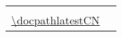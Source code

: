 
\begin{tiplisting}
    \vspace{-3.7em}
    \begin{longtable}[l]{ m{13.8cm}  p{2.5cm} }

        \makecell[l]{点击链接或扫描二维码确保您使用的是最新版本的文档：\\
            \parbox{13.8cm}{\url{\docpathlatestCN}}}
        & \qrcode[height=2cm]{\docpathlatestCN}\\
    \end{longtable}
\end{tiplisting}

\setcounter{table}{0}
